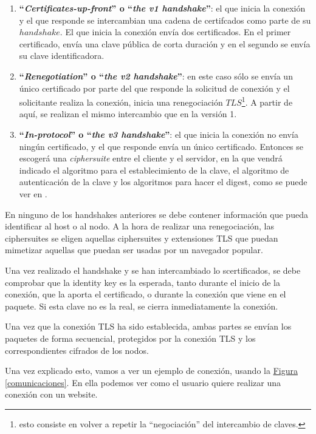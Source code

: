 \documentclass[10pt,a4paper,spanish]{article}
\begin{document}
\begin{enumerate}
    \item \textbf{``\textit{Certificates-up-front}'' o ``\textit{the v1 handshake}''}: el que inicia la conexión y el que responde se intercambian una cadena de certifcados como parte de su $handshake$. El que inicia la conexión envía dos certificados. En el primer certificado, envía una clave pública de corta duración y en el segundo se envía su clave identificadora.

    \item \textbf{``\textit{Renegotiation}'' o ``\textit{the v2 handshake}''}: en este caso sólo se envía un único certificado por parte del que responde la solicitud de conexión y el solicitante realiza la conexión, inicia una renegociación $TLS$\footnote{esto consiste en volver a repetir la ``negociación'' del intercambio de claves.}. A partir de aquí, se realizan el mismo intercambio que en la versión 1.

    \item \textbf{``\textit{In-protocol}'' o ``\textit{the v3 handshake}''}: el que inicia la conexión no envía ningún certificado, y el que responde envía un único certificado. Entonces se escogerá una \textit{ciphersuite} entre el cliente y el servidor, en la que vendrá indicado el algoritmo para el establecimiento de la clave, el algoritmo de autenticación de la clave y los algoritmos para hacer el digest, como se puede ver en \cite{ciphersuite}.
\end{enumerate}

En ninguno de los handshakes anteriores se debe contener información que pueda identificar al host o al nodo. A la hora de realizar una renegociación, las ciphersuites se eligen aquellas ciphersuites y extensiones TLS que puedan mimetizar aquellas que puedan ser usadas por un navegador popular.

Una vez realizado el handshake y se han intercambiado lo scertificados, se debe comprobar que la identity key es la esperada, tanto durante el inicio de la conexión, que la aporta el certificado, o durante la conexión que viene en el paquete. Si esta clave no es la real, se cierra inmediatamente la conexión.

Una vez que la conexión TLS ha sido establecida, ambas partes se envían los paquetes de forma secuencial, protegidos por la conexión TLS y los correspondientes cifrados de los nodos.

Una vez explicado esto, vamos a ver un ejemplo de conexión, usando la \hyperref[comunicaciones]{Figura \ref*{comunicaciones}}. En ella podemos ver como el usuario quiere realizar una conexión con un website.
\end{document}
